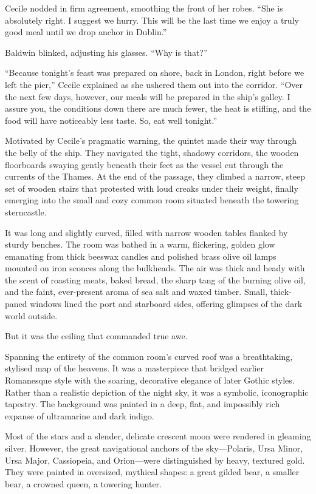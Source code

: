 Cecile nodded in firm agreement, smoothing the front of her robes. \enquote{She is absolutely right. I suggest we hurry. This will be the last time we enjoy a truly good meal until we drop anchor in Dublin.}

Baldwin blinked, adjusting his glasses. \enquote{Why is that?}

\enquote{Because tonight's feast was prepared on shore, back in London, right before we left the pier,} Cecile explained as she ushered them out into the corridor. \enquote{Over the next few days, however, our meals will be prepared in the ship's galley. I assure you, the conditions down there are much fewer, the heat is stifling, and the food will have noticeably less taste. So, eat well tonight.}

Motivated by Cecile's pragmatic warning, the quintet made their way through the belly of the ship. They navigated the tight, shadowy corridors, the wooden floorboards swaying gently beneath their feet as the vessel cut through the currents of the Thames. At the end of the passage, they climbed a narrow, steep set of wooden stairs that protested with loud creaks under their weight, finally emerging into the small and cozy common room situated beneath the towering sterncastle.

It was long and slightly curved, filled with narrow wooden tables flanked by sturdy benches. The room was bathed in a warm, flickering, golden glow emanating from thick beeswax candles and polished brass olive oil lamps mounted on iron sconces along the bulkheads. The air was thick and heady with the scent of roasting meats, baked bread, the sharp tang of the burning olive oil, and the faint, ever-present aroma of sea salt and waxed timber. Small, thick-paned windows lined the port and starboard sides, offering glimpses of the dark world outside.

But it was the ceiling that commanded true awe.

Spanning the entirety of the common room's curved roof was a breathtaking, stylised map of the heavens. It was a masterpiece that bridged earlier Romanesque style with the soaring, decorative elegance of later Gothic styles. Rather than a realistic depiction of the night sky, it was a symbolic, iconographic tapestry. The background was painted in a deep, flat, and impossibly rich expanse of ultramarine and dark indigo.

Most of the stars and a slender, delicate crescent moon were rendered in gleaming silver. However, the great navigational anchors of the sky---Polaris, Ursa Minor, Ursa Major, Cassiopeia, and Orion---were distinguished by heavy, textured gold. They were painted in oversized, mythical shapes: a great gilded bear, a smaller bear, a crowned queen, a towering hunter.

